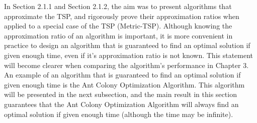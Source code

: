 \documentclass{article}
\begin{document}
In Section 2.1.1 and Section 2.1.2, the aim was to present algorithms that approximate the TSP, and rigorously prove their approximation ratios when applied to a special case of the TSP (Metric-TSP). Although knowing the approximation ratio of an algorithm is important, it is more convenient in practice to design an algorithm that is guaranteed to find an optimal solution if given enough time, even if it's approximation ratio is not known. This statement will become clearer when comparing the algorithm's performance in Chapter 3. An example of an algorithm that is guaranteed to find an optimal solution if given enough time is the Ant Colony Optimization Algorithm. This algorithm will be presented in the next subsection, and the main result in this section guarantees that the Ant Colony Optimization Algorithm will always find an optimal solution if given enough time (although the time may be infinite).
\end{document}
